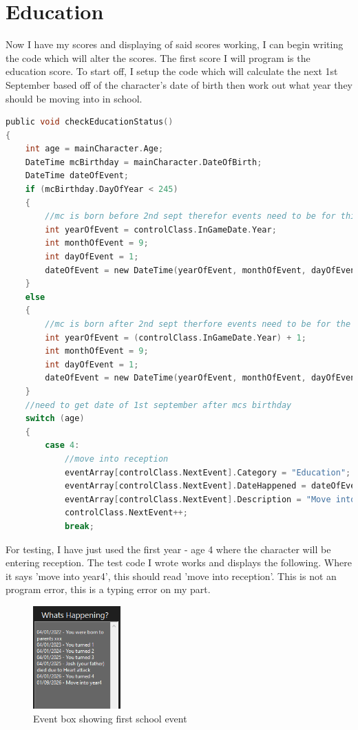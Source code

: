 \section{Education}
Now I have my scores and displaying of said scores working, I can begin writing the code which will alter the scores. The first score I will program is the education score. To start off, I setup the code which will calculate the next 1st September based off of the character's date of birth then work out what year they should be moving into in school.
\begin{lstlisting}[language=c, style=csharp, caption=Procedure to check the education status of the main character]
public void checkEducationStatus()
{
    int age = mainCharacter.Age;
    DateTime mcBirthday = mainCharacter.DateOfBirth;
    DateTime dateOfEvent;
    if (mcBirthday.DayOfYear < 245)
    {
        //mc is born before 2nd sept therefor events need to be for this september
        int yearOfEvent = controlClass.InGameDate.Year;
        int monthOfEvent = 9;
        int dayOfEvent = 1;
        dateOfEvent = new DateTime(yearOfEvent, monthOfEvent, dayOfEvent);
    }
    else
    {
        //mc is born after 2nd sept therfore events need to be for the following september
        int yearOfEvent = (controlClass.InGameDate.Year) + 1;
        int monthOfEvent = 9;
        int dayOfEvent = 1;
        dateOfEvent = new DateTime(yearOfEvent, monthOfEvent, dayOfEvent);
    }
    //need to get date of 1st september after mcs birthday
    switch (age)
    {
        case 4:
            //move into reception
            eventArray[controlClass.NextEvent].Category = "Education";
            eventArray[controlClass.NextEvent].DateHappened = dateOfEvent;
            eventArray[controlClass.NextEvent].Description = "Move into year 4";
            controlClass.NextEvent++;
            break;
\end{lstlisting}
For testing, I have just used the first year - age 4 where the character will be entering reception. The test code I wrote works and displays the following. Where it says  'move into year4', this should read 'move into reception'. This is not an program error, this is a typing error on my part.
\begin{figure}[H]
    \centering
    \includegraphics[width=0.3\textwidth]{images/implementation/educationTest1.png}
    \caption{Event box showing first school event}
    \label{fig:implementation-educationTest1}
\end{figure}
